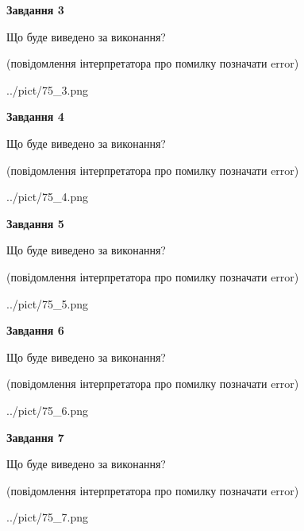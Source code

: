 \documentclass[12pt, ukrainian]{article}
\begin{document}
{\begin {large}
{\begin {center}\textbf{Завдання 3}\end {center}}\par
Що буде виведено за виконання?\par
 (повідомлення інтерпретатора про помилку позначати error)\par
\begin{center}
	{../pict/75_3.png}
\end{center}
\newpage

{\begin {center}\textbf{Завдання 4}\end {center}}\par
Що буде виведено за виконання?\par
 (повідомлення інтерпретатора про помилку позначати error)\par
\begin{center}
	{../pict/75_4.png}
\end{center}
\newpage

{\begin {center}\textbf{Завдання 5}\end {center}}\par
Що буде виведено за виконання?\par
 (повідомлення інтерпретатора про помилку позначати error)\par
\begin{center}
	{../pict/75_5.png}
\end{center}
\newpage

{\begin {center}\textbf{Завдання 6}\end {center}}\par
Що буде виведено за виконання?\par
 (повідомлення інтерпретатора про помилку позначати error)\par
\begin{center}
	{../pict/75_6.png}
\end{center}
\newpage

{\begin {center}\textbf{Завдання 7}\end {center}}\par
Що буде виведено за виконання?\par
 (повідомлення інтерпретатора про помилку позначати error)\par
\begin{center}
	{../pict/75_7.png}
\end{center}
\newpage


\end{large}}
\end{document}
